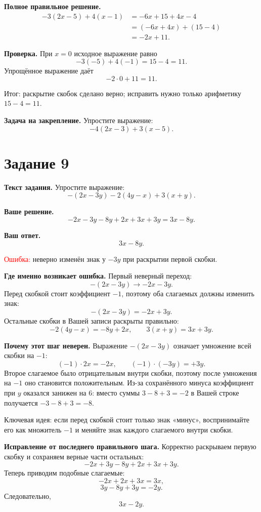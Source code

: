 \documentclass[12pt,a4paper]{article}
\begin{document}
\textbf{Полное правильное решение.}
\[
\begin{aligned}
-3(2x-5)+4(x-1)
&=-6x+15+4x-4\\
&=(-6x+4x)+(15-4)\\
&=-2x+11.
\end{aligned}
\]

\textbf{Проверка.}
При $x=0$ исходное выражение равно
\[
-3(-5)+4(-1)=15-4=11.
\]
Упрощённое выражение даёт
\[
-2\cdot 0+11=11.
\]

\textcolor{teal!60!black}{Итог:} раскрытие скобок сделано верно; исправить нужно только арифметику $15-4=11$.

\textbf{Задача на закрепление.}
Упростите выражение:
\[
-4(2x-3)+3(x-5).
\]

\newpage
{}\label{task:9}
\section*{Задание 9}

\textbf{Текст задания.}
Упростите выражение:
\[
-(2x-3y)-2(4y-x)+3(x+y).
\]

\textbf{Ваше решение.}
\[
-2x-3y-8y+2x+3x+3y=3x-8y.
\]

\textbf{Ваш ответ.}
\[
3x-8y.
\]

\textcolor{red}{Ошибка:} неверно изменён знак у $-3y$ при раскрытии первой скобки.

\textbf{Где именно возникает ошибка.}
Первый неверный переход:
\[
-(2x-3y)\rightarrow -2x-3y.
\]
Перед скобкой стоит коэффициент $-1$, поэтому оба слагаемых должны изменить знак:
\[
-(2x-3y)=-2x+3y.
\]
Остальные скобки в Вашей записи раскрыты правильно:
\[
-2(4y-x)=-8y+2x,
\qquad
3(x+y)=3x+3y.
\]

\textbf{Почему этот шаг неверен.}
Выражение $-(2x-3y)$ означает умножение всей скобки на $-1$:
\[
(-1)\cdot 2x=-2x,
\qquad
(-1)\cdot(-3y)=+3y.
\]
Второе слагаемое было отрицательным внутри скобки, поэтому после умножения на $-1$ оно становится положительным. Из-за сохранённого минуса коэффициент при $y$ оказался занижен на $6$: вместо суммы $3-8+3=-2$ в Вашей строке получается $-3-8+3=-8$.

\textcolor{blue!60!black}{Ключевая идея:} если перед скобкой стоит только знак «минус», воспринимайте его как множитель $-1$ и меняйте знак каждого слагаемого внутри скобки.

\textbf{Исправление от последнего правильного шага.}
Корректно раскрываем первую скобку и сохраняем верные части остальных:
\[
-2x+3y-8y+2x+3x+3y.
\]
Теперь приводим подобные слагаемые:
\[
-2x+2x+3x=3x,
\]
\[
3y-8y+3y=-2y.
\]
Следовательно,
\[
3x-2y.
\]
\end{document}
